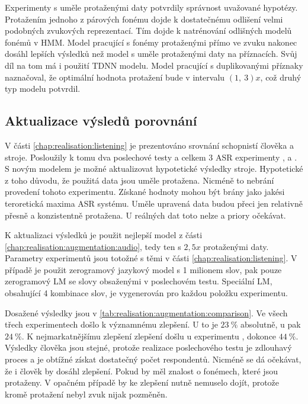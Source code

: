 Experimenty s uměle protaženými daty potvrdily správnost uvažované hypotézy. Protažením jednoho z párových fonému dojde k dostatečnému odlišení velmi podobných zvukových reprezentací. Tím dojde k natrénování odlišných modelů fonémů v HMM. Model pracující s fonémy protaženými přímo ve zvuku nakonec dosáhl lepších výsledků než model s uměle protaženými daty na příznacích. Svůj díl na tom má i použití TDNN modelu. Model pracující s duplikovanými příznaky naznačoval, že optimální hodnota protažení bude v intervalu $\left(1,\ 3\right)x$, což druhý typ modelu potvrdil.

\subsection{Aktualizace výsledů porovnání}
\label{chap:realisation:augmentation:comparison}

V části \ref{chap:realisation:listening} je prezentováno srovnání schopnistí člověka a stroje. Posloužily k tomu dva poslechové testy a celkem $3$ ASR experimenty ,  a . S novým modelem je možné aktualizovat hypotetické výsledky stroje. Hypotetické z toho důvodu, že použitá data jsou uměle protažena. Nicméně to nebrání provedení tohoto experimentu. Získané hodnoty mohou být brány jako jakési teroretická maxima ASR systému. Uměle upravená data budou přeci jen relativně přesně a konzistentně protažena. U reálných dat toto nelze a priory očekávat.

K aktualizaci výsledků je použit nejlepší model z části \ref{chap:realisation:augmentation:audio}, tedy ten s $2,5x$ protaženými daty. Parametry experimentů jsou totožné s těmi v části \ref{chap:realisation:listening}. V případě  je použit zerogramový jazykový model s 1 milionem slov,  pak pouze zerogramový LM se slovy obsaženými v poslechovém testu. Speciální LM, obsahující 4 kombinace slov, je vygenerován pro každou položku  experimentu.

Dosažené výsledky jsou v \ref{tab:realisation:augmentation:comparison}. Ve všech třech experimentech došlo k významnému zlepšení. U  to je $23\ \%$ absolutně, u  pak $24\ \%$. K nejmarkatnějšímu zlepšení zlepšení došlu u experimentu , dokonce $44\ \%$. Výsledky člověka jsou stejné, protože realizace poslechového testu je zdlouhavý proces a je obtížné získat dostatečný počet respondentů. Nicméně se dá očekávat, že i člověk by dosáhl zlepšení. Pokud by měl znalost o fonémech, které jsou protaženy. V opačném případě by ke zlepšení nutně nemuselo dojít, protože kromě protažení nebyl zvuk nijak pozměněn.

